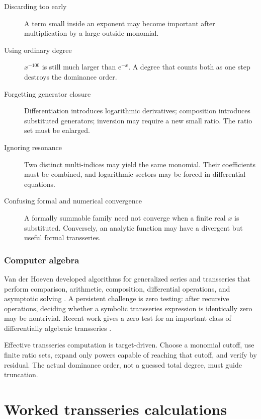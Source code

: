 \documentclass[11pt,oneside]{book}
\theoremstyle{definition}
\theoremstyle{remark}
\newcommand{\e}{\mathrm{e}}
\begin{document}
\begin{description}
\item[Discarding too early]
A term small inside an exponent may become important after multiplication by a
large outside monomial.

\item[Using ordinary degree]
$x^{-100}$ is still much larger than $\e^{-x}$. A degree that counts both as one
step destroys the dominance order.

\item[Forgetting generator closure]
Differentiation introduces logarithmic derivatives; composition introduces
substituted generators; inversion may require a new small ratio. The ratio set
must be enlarged.

\item[Ignoring resonance]
Two distinct multi-indices may yield the same monomial. Their coefficients must
be combined, and logarithmic sectors may be forced in differential equations.

\item[Confusing formal and numerical convergence]
A formally summable family need not converge when a finite real $x$ is
substituted. Conversely, an analytic function may have a divergent but useful
formal transseries.
\end{description}

\section{Computer algebra}

Van der Hoeven developed algorithms for generalized series and transseries that
perform comparison, arithmetic, composition, differential operations, and
asymptotic solving \cite{vanDerHoevenBook,vanDerHoevenOperators}. A persistent
challenge is zero testing: after recursive operations, deciding whether a
symbolic transseries expression is identically zero may be nontrivial. Recent
work gives a zero test for an important class of differentially algebraic
transseries \cite{ChenFangHoeven2026}.

\begin{summarybox}
Effective transseries computation is target-driven. Choose a monomial cutoff,
use finite ratio sets, expand only powers capable of reaching that cutoff, and
verify by residual. The actual dominance order, not a guessed total degree, must
guide truncation.
\end{summarybox}


\part{Worked transseries calculations}
\end{document}
